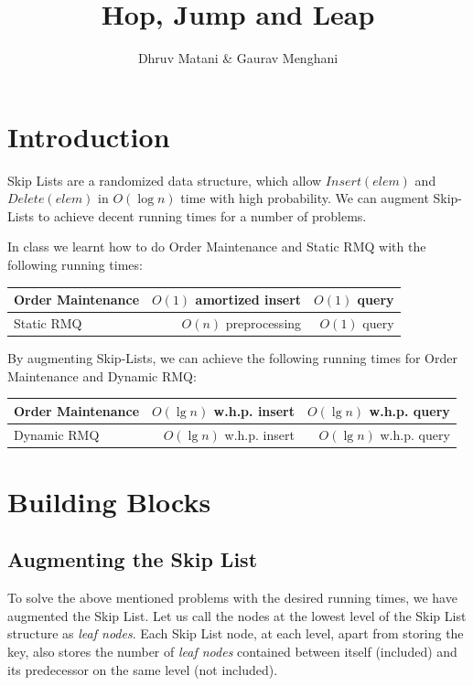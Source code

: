 \documentclass{article}
\title{Hop, Jump and Leap}
\author{Dhruv Matani \& Gaurav Menghani}
\begin{document}
\maketitle


\section{Introduction}

Skip Lists are a randomized data structure, which allow $Insert(elem)$
and $Delete(elem)$ in $O(\log{n})$ time with high probability. We can
augment Skip-Lists to achieve decent running times for a number of
problems.

In class we learnt how to do Order Maintenance and Static RMQ with the
following running times: 

\begin{center}
  \begin{tabular}{| l | r | r |}
    \hline
    Order Maintenance  & $O(1)$ amortized insert & $O(1)$ query  \\ \hline
    Static RMQ         & $O(n)$ preprocessing 	  & $O(1)$ query \\ \hline
  \end{tabular}
\end{center}

By augmenting Skip-Lists, we can achieve the following running times for
Order Maintenance and Dynamic RMQ:

\begin{center}
  \begin{tabular}{| l | r | r |}
    \hline
    Order Maintenance  & $O(\lg{n})$ w.h.p. insert  & $O(\lg{n})$ w.h.p. query  \\ \hline
    Dynamic RMQ        & $O(\lg{n})$ w.h.p. insert  & $O(\lg{n})$ w.h.p. query \\ \hline
  \end{tabular}
\end{center}

\clearpage

\section{Building Blocks}

\subsection{Augmenting the Skip List}

To solve the above mentioned problems with the desired running times,
we have augmented the Skip List. Let us call the nodes at the lowest
level of the Skip List structure as \emph{leaf nodes}. Each Skip List
node, at each level, apart from storing the key, also stores the
number of \emph{leaf nodes} contained between itself (included) and
its predecessor on the same level (not included).
\end{document}
